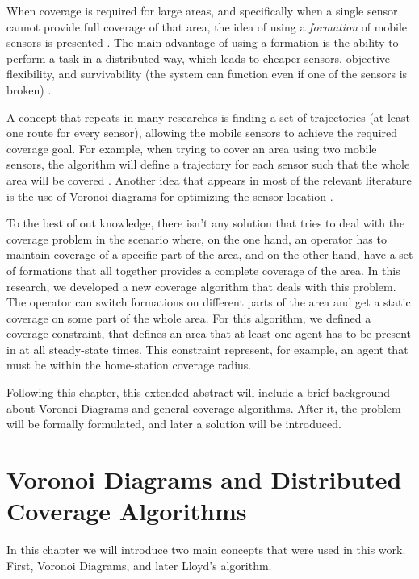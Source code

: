 \documentclass{iacas}
\begin{document}
When coverage is required for large areas, and specifically when a single sensor cannot provide full coverage of that area, the idea of using a \emph{formation} of mobile sensors is presented \cite{Hokayem2007}. The main advantage of using a formation is the ability to perform a task in a distributed way, which leads to cheaper sensors, objective flexibility, and survivability (the system can function even if one of the sensors is broken) \cite{Cortes2004}.

A concept that repeats in many researches is finding a set of trajectories (at least one route for every sensor), allowing the mobile sensors to achieve the required coverage goal.  For example, when trying to cover an area using two mobile sensors, the algorithm will define a trajectory for each sensor such that the whole area will be covered \cite{Atinc2013,Hussein2007}.
Another idea that appears in most of the relevant literature is the use of Voronoi diagrams for optimizing the sensor location \cite{Cortes2004,Hussein2007}. 

To the best of out knowledge, there isn't any solution that tries to deal with the coverage problem in the scenario where, on the one hand, an operator has to maintain coverage of a specific part of the area, and on the other hand, have a set of formations that all together provides a complete coverage of the area. In this research, we developed a new coverage algorithm that deals with this problem. The operator can switch formations on different parts of the area and get a static coverage on some part of the whole area. For this algorithm, we defined a coverage constraint, that defines an area that at least one agent has to be present in at all steady-state times. This constraint represent, for example, an agent that must be within the home-station coverage radius. 


Following this chapter, this extended abstract will include a brief background about Voronoi Diagrams and general coverage algorithms. After it, the problem will be formally formulated, and later a solution will be introduced.

\section{Voronoi Diagrams and Distributed Coverage Algorithms}
In this chapter we will introduce two main concepts that were used in this work. First, Voronoi Diagrams, and later Lloyd's algorithm.
\end{document}

